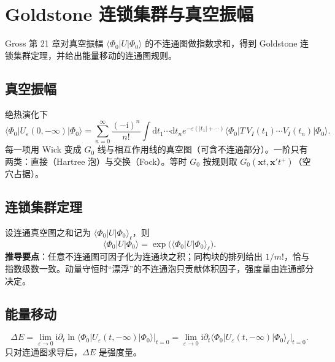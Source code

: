 \section{Goldstone 连锁集群与真空振幅}

Gross 第 21 章对真空振幅 $\langle\Phi_0|U|\Phi_0\rangle$ 的不连通图做指数求和，得到 Goldstone 连锁集群定理，并给出能量移动的连通图规则。

\subsection{真空振幅}

绝热演化下
\begin{equation}
  \langle\Phi_0|U_\varepsilon(0,-\infty)|\Phi_0\rangle
  =\sum_{n=0}^{\infty}
  \frac{(-\mathrm{i})^n}{n!}
  \int\mathrm{d}t_1\cdots\mathrm{d}t_n
  e^{-\varepsilon(|t_1|+\cdots)}
  \langle\Phi_0|T\,V_I(t_1)\cdots V_I(t_n)|\Phi_0\rangle.
\end{equation}
每一项用 Wick 变成 $G_0$ 线与相互作用线的真空图（可含不连通部分）。一阶只有两类：直接（Hartree 泡）与交换（Fock）。等时 $G_0$ 按规则取 $G_0(\mathbf{x}t,\mathbf{x}'t^+)$（空穴占据）。

\subsection{连锁集群定理}

设连通真空图之和记为 $\langle\Phi_0|U|\Phi_0\rangle_{\ell}$，则
\begin{equation}
  \langle\Phi_0|U|\Phi_0\rangle
  =\exp\bigl(\langle\Phi_0|U|\Phi_0\rangle_{\ell}\bigr).
\label{eq:goldstone}
\end{equation}
\textbf{推导要点}：任意不连通图可因子化为连通块之积；同构块的排列给出 $1/m!$，恰与指数级数一致。动量守恒时“漂浮”的不连通泡只贡献体积因子，强度量由连通部分决定。

\subsection{能量移动}

\begin{equation}
  \Delta E
  =\lim_{\varepsilon\to0}
  \mathrm{i}
  \partial_t
  \ln\langle\Phi_0|U_\varepsilon(t,-\infty)|\Phi_0\rangle\Big|_{t=0}
  =\lim_{\varepsilon\to0}
  \mathrm{i}
  \partial_t
  \langle\Phi_0|U_\varepsilon(t,-\infty)|\Phi_0\rangle_{\ell}\Big|_{t=0}.
\end{equation}
只对连通图求导后，$\Delta E$ 是强度量。

